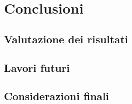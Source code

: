 \documentclass[%
  a4paper,                %
  fontsize=12pt,          %
  twoside,                %
  openany,              %
  titlepage,              %
  final                   %
  headings=standardclasses, %
  headings=big,             %
  chapterprefix=false       %
]{scrbook}
\begin{document}
  \part{Conclusioni}\label{part:conclusion}
    \chapter{Valutazione dei risultati}\label{ch:evaluation}
    \chapter{Lavori futuri}\label{ch:future}
    \chapter{Considerazioni finali}\label{ch:considerations}

  \appendix
  

  \backmatter{}
  
  
\end{document}
